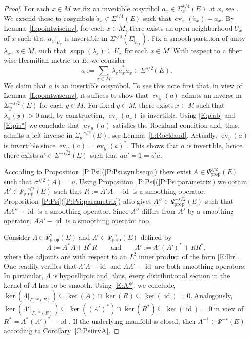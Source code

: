 \documentclass[reqno,12pt]{amsart}
\DeclareMathOperator{\supp}{supp}
\DeclareMathOperator{\ev}{ev}
\DeclareMathOperator{\id}{id}
\newcommand\prop{\textrm{prop}}
\newcommand\itemref[1]{(\ref{#1})}
\theoremstyle{plain}
\theoremstyle{definition}
\begin{document}
\begin{proof}
For each $x\in M$ we fix an invertible cosymbol $a_x\in\Sigma^{s/4}_x(E)$ at $x$, see \cite[Theorem~6.1]{CGGP92}.
We extend these to cosymbols $\tilde a_x\in\Sigma^{s/4}(E)$ such that $\ev_x(\tilde a_x)=a_x$.
By Lemma~\ref{L:pointwiseinv}, for each $x\in M$, there exists an open neighborhood $U_x$ of $x$ such that $\tilde a_x|_{U_x}$ is invertible in $\Sigma^{s/4}(E|_{U_x})$.
Fix a smooth partition of unity $\lambda_x$, $x\in M$, such that $\supp(\lambda_x)\subseteq U_x$ for each $x\in M$.
With respect to a fiber wise Hermitian metric on $E$, we consider 
$$
a:=\sum_{x\in M}\lambda_x\tilde a_x^*\tilde a_x\in\Sigma^{s/2}(E).
$$
We claim that $a$ is an invertible cosymbol.
To see this note first that, in view of Lemma~\ref{L:pointwiseinv}, it suffices to show that $\ev_y(a)$ admits an inverse in $\Sigma^{-s/2}_y(E)$ for each $y\in M$.
For fixed $y\in M$, there exists $x\in M$ such that $\lambda_x(y)>0$ and, by construction, $\ev_y(\tilde a_x)$ is invertible.
Using \eqref{E:piab} and \eqref{E:pia*} we conclude that $\ev_y(a)$ satisfies the Rockland condition and, thus, admits a left inverse in $\Sigma^{-s/2}_y(E)$, see Lemma~\ref{L:Rockland}.
Actually, $\ev_y(a)$ is invertible since $\ev_y(a)=\ev_y(a)^*$.
This shows that $a$ is invertible, hence there exists $a'\in\Sigma^{-s/2}(E)$ such that $aa'=1=a'a$.


According to Proposition~\ref{P:Psi}\itemref{P:Psi:symbsequ} there exist $A\in\Psi^{s/2}_\prop(E)$ such that $\sigma^{s/2}(A)=a$.
Using Proposition~\ref{P:Psi}\itemref{P:Psi:parametrix} we obtain $A'\in\Psi^{-s/2}_\prop(E)$ such that $R:=A'A-\id$ is a smoothing operator.
Proposition~\ref{P:Psi}\itemref{P:Psi:parametrix} also gives $A''\in\Psi_\prop^{-s/2}(E)$ such that $AA''-\id$ is a smoothing operator.
Since $A''$ differs from $A'$ by a smoothing operator, $AA'-\id$ is a smoothing operator too.


Consider $\Lambda\in\Psi^s_\prop(E)$ and $\Lambda'\in\Psi^{-s}_\prop(E)$ defined by 
$$
\Lambda:=A^*A+R^*R\qquad\text{and}\qquad\Lambda':=A'(A')^*+RR^*,
$$ 
where the adjoints are with respect to an $L^2$ inner product of the form \eqref{E:llrr}.
One readily verifies that $\Lambda'\Lambda-\id$ and $\Lambda\Lambda'-\id$ are both smoothing operators.
In particular, $\Lambda$ is hypoelliptic and, thus, every distributional section in the kernel of $\Lambda$ has to be smooth.
Using~\eqref{E:A*}, we conclude, $\ker(\Lambda|_{\Gamma^{-\infty}_c(E)})\subseteq\ker(A)\cap\ker(R)\subseteq\ker(\id)=0$.
Analogously, $\ker(\Lambda'|_{\Gamma^{-\infty}_c(E)})\subseteq\ker((A')^*)\cap\ker(R^*)\subseteq\ker(\id)=0$ in view of $R^*=A^*(A')^*-\id$.
If the underlying manifold is closed, then $\Lambda^{-1}\in\Psi^{-s}(E)$ according to Corollary~\ref{C:PsiinvA}.
\end{proof}
\end{document}
